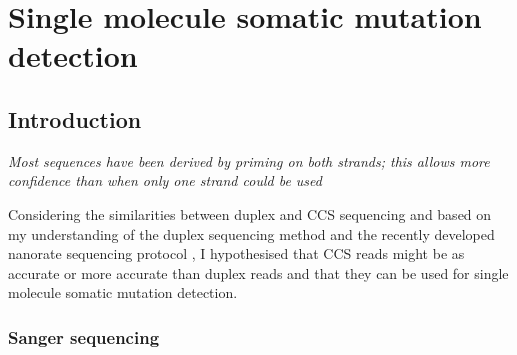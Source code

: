 
\chapter{Single molecule somatic mutation detection}

\ifpdf
    \graphicspath{{Chapter2/Figs/Raster/}{Chapter2/Figs/PDF/}{Chapter2/Figs/}}
\else
    \graphicspath{{Chapter2/Figs/Vector/}{Chapter2/Figs/}}
\fi

\section{Introduction}

\textit{Most sequences have been derived by priming on both strands; this allows more confidence than when only one strand could be used} \cite{Sanger1977-os}
\begin{flushright}  \end{flushright}

Considering the similarities between duplex and CCS sequencing and based on my understanding of the duplex sequencing method \cite{Schmitt2012-yr, Hoang2016-jx} and the recently developed nanorate sequencing protocol \cite{Abascal2021-pk}, I hypothesised that CCS reads might be as accurate or more accurate than duplex reads and that they can be used for single molecule somatic mutation detection. \newline

\subsection{Sanger sequencing}

